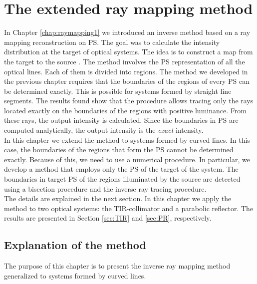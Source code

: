 \chapter{The extended ray mapping method}
\label{chap:raymapping2}
In Chapter \ref{chap:raymapping1} we introduced an inverse method based on a ray mapping reconstruction on PS.
The goal was to calculate the intensity distribution at the target of optical systems. 
The idea is to construct a map from the target  to the source . 
The method involves the PS representation of all the optical lines. Each of them is divided into regions.  
The method we developed in the previous chapter requires that the boundaries of the regions of every PS can be determined exactly. This is possible for systems formed by straight line segments.
The results found show that the procedure allows tracing only the rays located exactly on the boundaries of the regions with positive luminance. From these rays, the output intensity is calculated. Since the boundaries in PS are computed analytically, the output intensity is the \textit{exact} intensity. \\ \indent
In this chapter we extend the method to systems formed by curved lines. In this case, the boundaries of the regions that form the PS cannot be determined exactly.
Because of this, we need to use a numerical procedure. In particular, we develop a method that employs only the PS of the target of the system. 
The boundaries in target PS of the regions illuminated by the source are detected using a bisection procedure and the inverse ray tracing procedure.\\ \indent
The details are explained in the next section. In this chapter we apply the method to two optical systems: the TIR-collimator and a parabolic reflector. The results are presented in Section \ref{sec:TIR} and \ref{sec:PR}, respectively.
\section{Explanation of the method}
The purpose of this chapter is to present the inverse ray mapping method generalized to systems formed by curved lines. 

